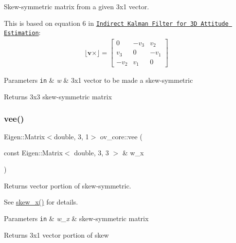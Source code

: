 Skew-\/symmetric matrix from a given 3x1 vector. 

This is based on equation 6 in \href{http://mars.cs.umn.edu/tr/reports/Trawny05b.pdf}{\tt Indirect Kalman Filter for 3D Attitude Estimation}\+: \begin{align*} \lfloor\mathbf{v}\times\rfloor = \begin{bmatrix} 0 & -v_3 & v_2 \\ v_3 & 0 & -v_1 \\ -v_2 & v_1 & 0 \end{bmatrix} \end{align*}


\begin{DoxyParams}[1]{Parameters}
\mbox{\tt in}  & {\em w} & 3x1 vector to be made a skew-\/symmetric \\
\hline
\end{DoxyParams}
\begin{DoxyReturn}{Returns}
3x3 skew-\/symmetric matrix 
\end{DoxyReturn}
\mbox{\label{namespaceov__core_aaf2593d3bde63e31ac9fc20e345271dc}} 
\subsubsection{\texorpdfstring{vee()}{vee()}}
{\footnotesize\ttfamily Eigen\+::\+Matrix$<$double, 3, 1$>$ ov\+\_\+core\+::vee (\begin{DoxyParamCaption}\item[{const Eigen\+::\+Matrix$<$ double, 3, 3 $>$ \&}]{w\+\_\+x }\end{DoxyParamCaption})\hspace{0.3cm}{\ttfamily [inline]}}



Returns vector portion of skew-\/symmetric. 

See \hyperlink{namespaceov__core_a24012c54df35621a935655b2e230169d}{skew\+\_\+x()} for details.


\begin{DoxyParams}[1]{Parameters}
\mbox{\tt in}  & {\em w\+\_\+x} & skew-\/symmetric matrix \\
\hline
\end{DoxyParams}
\begin{DoxyReturn}{Returns}
3x1 vector portion of skew 
\end{DoxyReturn}
